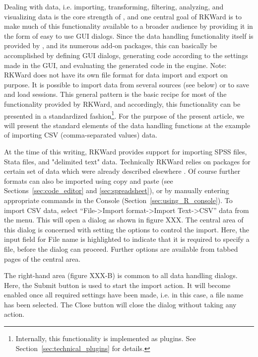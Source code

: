 Dealing with data, i.e. importing, transforming, filtering, analyzing, and visualizing data is the core
strength of , and one central goal of
RKWard is to make much of this functionality available to a broader
audience by providing it in the form of easy to use GUI dialogs. Since
the data handling functionality itself is provided by
, and its numerous add-on packages, this
can basically be accomplished by defining GUI dialogs, generating
 code according to the settings made in
the GUI, and evaluating the generated code in the
 engine. Note: RKWard does not have its
own file format for data import and export on purpose. It is possible
to import data from several sources (see below) or to save and load
 sessions. This general pattern is the
basic recipe for most of the functionality provided by RKWard, and
accordingly, this functionality can be presented in a standardized
fashion\footnote{Internally, this functionality is implemented as
plugins. See Section~\ref{sec:technical_plugins} for details.}. For
the purpose of the present article, we will present the standard
elements of the data handling functions at the example of importing CSV
(comma-separated values) data.

At the time of this writing, RKWard provides support for importing SPSS
files, Stata files, and "delimited text" data. Technically RKWard
relies on  packages for certain set of
data which were already described elsewhere
\citep{Murdoch2002}. Of course further formats can
also be imported using copy and paste (see Sections~\ref{sec:code_editor} and \ref{sec:spreadsheet}), or by
manually entering appropriate  commands in
the  Console (Section~\ref{sec:using_R_console}). To import CSV
data, select ``File->Import format->Import Text->CSV''
data from the menu. This will open a dialog as shown in
figure XXX. The central area of this dialog is concerned with setting
the options to control the import. Here, the input field for
File name is highlighted to indicate that
it is required to specify a file, before the dialog can proceed.
Further options are available from tabbed pages of the central area.

The right-hand area (figure XXX-B) is common to all data handling
dialogs. Here, the Submit button is used
to start the import action. It will become enabled once all required
settings have been made, i.e. in this case, a file name has been
selected. The Close button will close the
dialog without taking any action.

